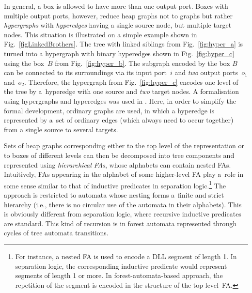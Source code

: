 In general, a box is allowed to have more than one output port. Boxes with
multiple output ports, however, reduce heap graphs not to graphs but rather
\emph{hypergraphs} with \emph{hyperedges} having a single source node, but
multiple target nodes. This situation is illustrated on a simple example shown
in Fig.~\ref{figLinkedBrothers}. The tree with linked siblings from
Fig.~\ref{fig:hyper_a} is turned into a hypergraph with binary
hyperedges shown in Fig.~\ref{fig:hyper_c} using the box~$B$ from
Fig.~\ref{fig:hyper_b}. The subgraph encoded by the box $B$ can be
connected to its surroundings via its input port~$i$ and \emph{two} output
ports~$o_1$ and~$o_2$.
Therefore, the hypergraph from Fig.~\ref{fig:hyper_c}
encodes one level of the tree by a~hyperedge with one source and \emph{two}
target nodes.
%
A formalisation using hypergraphs and hyperedges was used in \cite{forester12}.
Here, in order to simplify the formal development, ordinary graphs are used, 
in which a hyperedge is represented by a~set of ordinary edges (which always
need to occur together) from a single source to several targets.

Sets of heap graphs corresponding either to the  top level of the
representation or to boxes of different levels can then be decomposed into
tree components and represented using \emph{hierarchical FAs}, whose
alphabets can contain nested FAs.
Intuitively, FAs appearing in the alphabet of some higher-level FA play a~role
in some sense similar to that of inductive predicates in  separation
logic.\footnote{For
instance, a nested FA is used to encode a DLL segment of length 1.  In separation
logic, the corresponding inductive predicate would represent segments of length
1 or more. In forest-automata-based approach, the repetition of the segment is encoded in the
structure of the top-level~FA.} The approach is restricted to automata whose nesting forms
a~finite and strict hierarchy (i.e., there is no circular use of the automata in
their alphabets). 
This is obviously different from separation logic, where recursive inductive predicates are standard.
This kind of recursion is in forest automata represented through cycles of tree automata transitions.







